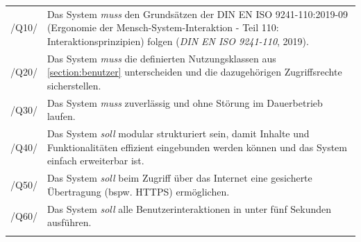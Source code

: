 \begin{center}
        \renewcommand{\arraystretch}{1.5}
        \begin{longtable}{lp{}} \arrayrulecolor{maincolor}\hline
                 \sffamily\color{maincolor}/Q10/ & Das System \textit{muss} den Grundsätzen der DIN
                EN ISO 9241-110:2019-09 (Ergonomie der Mensch-System-Interaktion - Teil 110:
                Interaktionsprinzipien) folgen (\textit{DIN EN ISO 9241-110}, 2019). \\
                 \sffamily\color{maincolor}/Q20/ & Das System \textit{muss} die definierten
                Nutzungsklassen aus \ref{section:benutzer} unterscheiden und die dazugehörigen
                Zugriffsrechte sicherstellen. \\
                \sffamily\color{maincolor}/Q30/ & Das System \textit{muss} zuverlässig und ohne
                Störung im Dauerbetrieb laufen.\\
                 \sffamily\color{maincolor}/Q40/ & Das System \textit{soll} modular strukturiert
                sein, damit Inhalte und Funktionalitäten effizient eingebunden werden können und das
                System einfach erweiterbar ist. \\
                 \sffamily\color{maincolor}/Q50/ & Das System \textit{soll} beim Zugriff über das
                Internet eine gesicherte Übertragung (bspw. \ac{HTTPS}) ermöglichen. \\
                 \sffamily\color{maincolor}/Q60/ & Das System \textit{soll} alle
                Benutzerinteraktionen in unter fünf Sekunden ausführen. \\
                \arrayrulecolor{maincolor}\hline
        \end{longtable}
\end{center}
